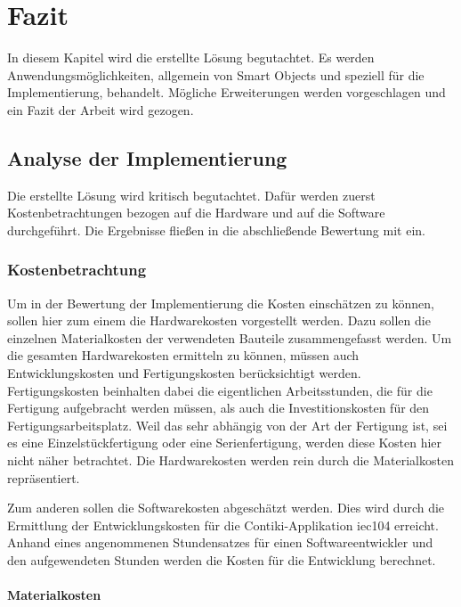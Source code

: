 
\chapter{Fazit} \label{Fazit}

In diesem Kapitel wird die erstellte Lösung begutachtet. Es werden Anwendungsmöglichkeiten, allgemein von Smart Objects und speziell für die Implementierung, behandelt. Mögliche Erweiterungen werden vorgeschlagen und ein Fazit der Arbeit wird gezogen.

\section{Analyse der Implementierung}

Die erstellte Lösung wird kritisch begutachtet. Dafür werden zuerst Kostenbetrachtungen bezogen auf die Hardware und auf die Software durchgeführt. Die Ergebnisse fließen in die abschließende Bewertung mit ein. 

\subsection{Kostenbetrachtung}

Um in der Bewertung der Implementierung die Kosten einschätzen zu können, sollen hier zum einem die Hardwarekosten vorgestellt werden. Dazu sollen die einzelnen Materialkosten der verwendeten Bauteile zusammengefasst werden. Um die gesamten Hardwarekosten ermitteln zu können, müssen auch Entwicklungskosten und Fertigungskosten berücksichtigt werden. Fertigungskosten beinhalten dabei die eigentlichen Arbeitsstunden, die für die Fertigung aufgebracht werden müssen, als auch die Investitionskosten für den Fertigungsarbeitsplatz. Weil das sehr abhängig von der Art der Fertigung ist, sei es eine Einzelstückfertigung oder eine Serienfertigung, werden diese Kosten hier nicht näher betrachtet. Die Hardwarekosten werden rein durch die Materialkosten repräsentiert.

Zum anderen sollen die Softwarekosten abgeschätzt werden. Dies wird durch die Ermittlung der Entwicklungskosten für die Contiki-Applikation iec104 erreicht. Anhand eines angenommenen Stundensatzes für einen Softwareentwickler und den aufgewendeten Stunden werden die Kosten für die Entwicklung berechnet.

\subsubsection{Materialkosten}

